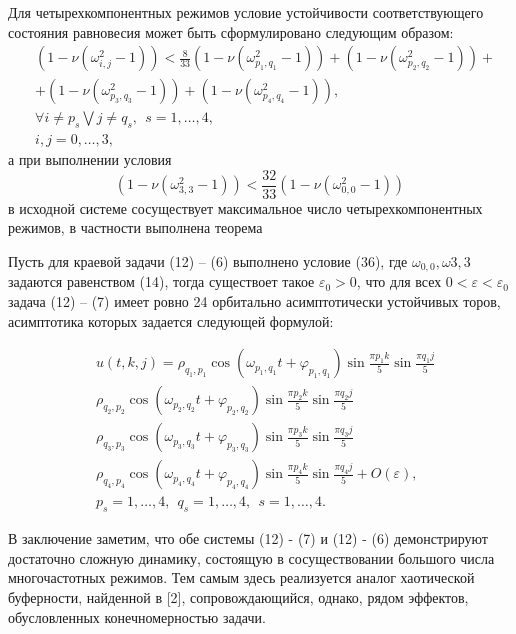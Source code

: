\documentclass[12pt]{article}  %
\begin{document}
Для четырехкомпонентных режимов условие устойчивости соответствующего состояния равновесия может быть сформулировано следующим образом:
\begin{equation}
\begin{split}
&(1-\nu(\omega^2_{i,j}-1))<\frac{8}{33}(1-\nu(\omega^2_{p_1,q_1}-1))+(1-\nu(\omega^2_{p_2,q_2}-1))+\\
&+(1-\nu(\omega^2_{p_3,q_3}-1))+(1-\nu(\omega^2_{p_4,q_4}-1)),\\
&\forall i\not=p_s \bigvee j\not=q_s,\ \ s=1,\dots,4, \\ 
&i,j=0,\dots,3,
\end{split}
\end{equation}
а при выполнении условия 
\begin{equation}
(1-\nu(\omega^2_{3,3}-1))<\frac{32}{33}(1-\nu(\omega^2_{0,0}-1))
\end{equation}
в исходной системе сосуществует максимальное число четырехкомпонентных режимов, в частности выполнена теорема
\begin{Th}
	Пусть для краевой задачи (12) \--- (6) выполнено условие (36), где $\omega_{0,0},\omega{3,3}$ задаются равенством (14), тогда существоет такое $\varepsilon_0>0$, что для всех $0<\varepsilon<\varepsilon_0$ задача (12) \--- (7) имеет ровно 24 орбитально асимптотически устойчивых торов, асимптотика которых задается следующей формулой:
\end{Th}

\begin{equation}
\begin{split}
&u(t,k,j)=\rho_{q_1,p_1}\cos(\omega_{p_1,q_1}t + \varphi_{p_1,q_1})\sin\frac{\pi p_1k}5\sin\frac{\pi q_1j}{5}\\
&\rho_{q_2,p_2}\cos(\omega_{p_2,q_2}t + \varphi_{p_2,q_2})\sin\frac{\pi p_2k}5\sin\frac{\pi q_2j}5\\
&\rho_{q_3,p_3}\cos(\omega_{p_3,q_3}t + \varphi_{p_3,q_3})\sin\frac{\pi p_3k}5\sin\frac{\pi q_3j}5\\
&\rho_{q_4,p_4}\cos(\omega_{p_4,q_4}t + \varphi_{p_4,q_4})\sin\frac{\pi p_4k}5\sin\frac{\pi q_4j}5 + O(\varepsilon),\\
&p_s=1,\dots,4,\ \ q_s=1,\dots,4,\ \ s=1,\dots,4.\ \ 
\end{split}
\end{equation}

В заключение заметим, что обе системы (12) - (7) и (12) - (6) демонстрируют достаточно сложную динамику, состоящую в сосуществовании большого числа многочастотных режимов. Тем самым здесь реализуется аналог хаотической буферности, найденной в [2], сопровождающийся, однако, рядом эффектов, обусловленных конечномерностью задачи.
\end{document}
